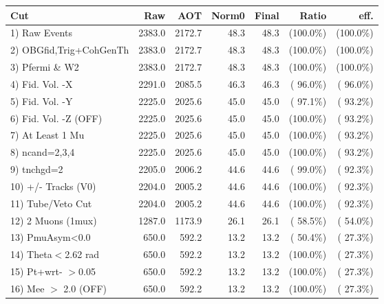  \begin{table}[h!]\centering
 \begin{tabular}{||l||r|r|r|r|r|r||}
 \hline
 \hline
 Cut & Raw & AOT & Norm0 & Final & Ratio & eff.       \\
 \hline
  1) Raw Events           &       2383.0 &       2172.7 &         48.3 &         48.3 & (100.0\%) & (100.0\%) \\
  2) OBGfid,Trig+CohGenTh &       2383.0 &       2172.7 &         48.3 &         48.3 & (100.0\%) & (100.0\%) \\
  3) Pfermi \& W2         &       2383.0 &       2172.7 &         48.3 &         48.3 & (100.0\%) & (100.0\%) \\
  4) Fid. Vol. -X         &       2291.0 &       2085.5 &         46.3 &         46.3 & ( 96.0\%) & ( 96.0\%) \\
  5) Fid. Vol. -Y         &       2225.0 &       2025.6 &         45.0 &         45.0 & ( 97.1\%) & ( 93.2\%) \\
  6) Fid. Vol. -Z (OFF)   &       2225.0 &       2025.6 &         45.0 &         45.0 & (100.0\%) & ( 93.2\%) \\
  7) At Least 1 Mu        &       2225.0 &       2025.6 &         45.0 &         45.0 & (100.0\%) & ( 93.2\%) \\
  8) ncand=2,3,4          &       2225.0 &       2025.6 &         45.0 &         45.0 & (100.0\%) & ( 93.2\%) \\
  9) tnchgd=2             &       2205.0 &       2006.2 &         44.6 &         44.6 & ( 99.0\%) & ( 92.3\%) \\
 10) +/- Tracks (V0)      &       2204.0 &       2005.2 &         44.6 &         44.6 & (100.0\%) & ( 92.3\%) \\
 11) Tube/Veto Cut        &       2204.0 &       2005.2 &         44.6 &         44.6 & (100.0\%) & ( 92.3\%) \\
 12) 2 Muons (1mux)       &       1287.0 &       1173.9 &         26.1 &         26.1 & ( 58.5\%) & ( 54.0\%) \\
 13) PmuAsym<0.0          &        650.0 &        592.2 &         13.2 &         13.2 & ( 50.4\%) & ( 27.3\%) \\
 14) Theta$<$2.62 rad     &        650.0 &        592.2 &         13.2 &         13.2 & (100.0\%) & ( 27.3\%) \\
 15) Pt+wrt- $>$0.05      &        650.0 &        592.2 &         13.2 &         13.2 & (100.0\%) & ( 27.3\%) \\
 16) Mee $>$ 2.0  (OFF)   &        650.0 &        592.2 &         13.2 &         13.2 & (100.0\%) & ( 27.3\%) \\

\end{tabular}
\end{table}
